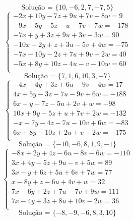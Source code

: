 \documentclass[12pt,oneside,a4paper]{article}
\begin{document}
\begin{equation*}
\text{Solução = }\{10,-6,2,7,-7,5\}
\end{equation*}
\vspace{\baselineskip}
\begin{equation*}
\begin{cases}
-2x+10y-7z+9u+7v+8w=9 \\
-9x-5y-5z-u-7v+7w=-178 \\
-7x+y+3z+9u+3v-3w=90 \\
-10x+2y+z+3u-5v+4w=-75 \\
-7x-10y-2z+7u+9v-2w=40 \\
-5x+8y+10z-4u-v-10w=60 \\
\end{cases}
\end{equation*}
\begin{equation*}
\text{Solução = }\{7,1,6,10,3,-7\}
\end{equation*}
\vspace{\baselineskip}
\begin{equation*}
\begin{cases}
-4x-4y+3z+6u-9v-4w=17 \\
4x+5y-3z-7u-9v+6w=-188 \\
6x-y-7z-5u+2v+w=-98 \\
10x+9y-5z+u+7v+2w=-132 \\
-x-7y-4z-7u-10v+6w=-83 \\
6x+8y-10z+2u+v-2w=-175 \\
\end{cases}
\end{equation*}
\begin{equation*}
\text{Solução = }\{-10,-6,8,1,9,-1\}
\end{equation*}
\vspace{\baselineskip}
\begin{equation*}
\begin{cases}
-8x+2y+4z-6u-8v-6w=-110 \\
3x+4y-5z+9u-v+5w=89 \\
3x-y+6z+5u+6v+7w=77 \\
x-8y+z-6u+4v+w=32 \\
7x-6y+2z+7u-7v+9w=111 \\
7x-4y+3z+8u+10v-2w=36 \\
\end{cases}
\end{equation*}
\begin{equation*}
\text{Solução = }\{-8,-9,-6,8,3,10\}
\end{equation*}
\end{document}
